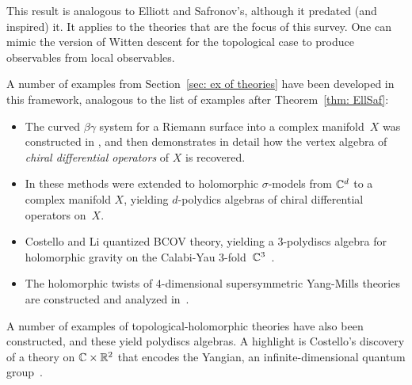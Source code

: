 \documentclass[11pt]{amsart}
\begin{document}
This result is analogous to Elliott and Safronov's, although it predated (and inspired) it.
It applies to the theories that are the focus of this survey.
One can mimic the version of Witten descent for the topological case to produce observables from local observables.

A number of examples from Section~\ref{sec: ex of theories} have been developed in this framework, 
analogous to the list of examples after Theorem~\ref{thm: EllSaf}:
\begin{itemize}
\item The curved $\beta\gamma$ system for a Riemann surface into a complex manifold~$X$ was constructed in \cite{CosWG2}, and then \cite{GGW} demonstrates in detail how the vertex algebra of {\it chiral differential operators} of $X$ is recovered.
\item In \cite{Wthesis} these methods were extended to holomorphic $\sigma$-models from $\mathbb C^d$ to a complex manifold $X$, 
yielding $d$-polydics algebras of chiral differential operators on~$X$.
\item Costello and Li quantized BCOV theory, yielding a 3-polydiscs algebra for holomorphic gravity on the Calabi-Yau 3-fold~$\mathbb C^3$~\cite{CLbcovOC}.
\item The holomorphic twists of 4-dimensional supersymmetric Yang-Mills theories are constructed and analyzed in~\cite{EGW}.
\end{itemize}
A number of examples of topological-holomorphic theories have also been constructed, and these yield polydiscs algebras.
A highlight is Costello's discovery of a theory on $\mathbb C \times \mathbb R^2$ that encodes the Yangian, an infinite-dimensional quantum group~\cite{CosYangian}.
\end{document}
